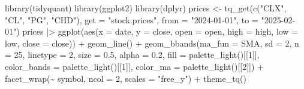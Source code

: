 \documentclass[
  letterpaper,
  DIV=11,
  numbers=noendperiod]{scrartcl}
\newenvironment{Shaded}{\begin{snugshade}}{\end{snugshade}}
\newcommand{\AttributeTok}[1]{\textcolor[rgb]{0.40,0.45,0.13}{#1}}
\newcommand{\DecValTok}[1]{\textcolor[rgb]{0.68,0.00,0.00}{#1}}
\newcommand{\FloatTok}[1]{\textcolor[rgb]{0.68,0.00,0.00}{#1}}
\newcommand{\FunctionTok}[1]{\textcolor[rgb]{0.28,0.35,0.67}{#1}}
\newcommand{\NormalTok}[1]{\textcolor[rgb]{0.00,0.23,0.31}{#1}}
\newcommand{\OtherTok}[1]{\textcolor[rgb]{0.00,0.23,0.31}{#1}}
\newcommand{\SpecialCharTok}[1]{\textcolor[rgb]{0.37,0.37,0.37}{#1}}
\newcommand{\StringTok}[1]{\textcolor[rgb]{0.13,0.47,0.30}{#1}}
\begin{document}
\begin{Shaded}
\begin{Highlighting}[]
\FunctionTok{library}\NormalTok{(tidyquant)}
\FunctionTok{library}\NormalTok{(ggplot2)}
\FunctionTok{library}\NormalTok{(dplyr)}
\NormalTok{prices }\OtherTok{\textless{}{-}} \FunctionTok{tq\_get}\NormalTok{(}\FunctionTok{c}\NormalTok{(}\StringTok{"CLX"}\NormalTok{, }\StringTok{"CL"}\NormalTok{, }\StringTok{"PG"}\NormalTok{, }\StringTok{"CHD"}\NormalTok{), }\AttributeTok{get =} \StringTok{"stock.prices"}\NormalTok{, }\AttributeTok{from =} \StringTok{"2024{-}01{-}01"}\NormalTok{, }
  \AttributeTok{to =} \StringTok{"2025{-}02{-}01"}\NormalTok{)}
\NormalTok{prices }\SpecialCharTok{|\textgreater{}}
  \FunctionTok{ggplot}\NormalTok{(}\FunctionTok{aes}\NormalTok{(}\AttributeTok{x =}\NormalTok{ date, }\AttributeTok{y =}\NormalTok{ close, }\AttributeTok{open =}\NormalTok{ open,}
              \AttributeTok{high =}\NormalTok{ high, }\AttributeTok{low =}\NormalTok{ low, }\AttributeTok{close =}\NormalTok{ close)) }\SpecialCharTok{+}
    \FunctionTok{geom\_line}\NormalTok{() }\SpecialCharTok{+}
    \FunctionTok{geom\_bbands}\NormalTok{(}\AttributeTok{ma\_fun =}\NormalTok{ SMA, }\AttributeTok{sd =} \DecValTok{2}\NormalTok{, }\AttributeTok{n =} \DecValTok{25}\NormalTok{,}
                \AttributeTok{linetype =} \DecValTok{2}\NormalTok{, }\AttributeTok{size =} \FloatTok{0.5}\NormalTok{, }\AttributeTok{alpha =} \FloatTok{0.2}\NormalTok{,}
                \AttributeTok{fill        =} \FunctionTok{palette\_light}\NormalTok{()[[}\DecValTok{1}\NormalTok{]],}
                \AttributeTok{color\_bands =} \FunctionTok{palette\_light}\NormalTok{()[[}\DecValTok{1}\NormalTok{]],}
                \AttributeTok{color\_ma    =} \FunctionTok{palette\_light}\NormalTok{()[[}\DecValTok{2}\NormalTok{]]) }\SpecialCharTok{+}
    \FunctionTok{facet\_wrap}\NormalTok{(}\SpecialCharTok{\textasciitilde{}}\NormalTok{ symbol, }\AttributeTok{ncol =} \DecValTok{2}\NormalTok{, }\AttributeTok{scales =} \StringTok{"free\_y"}\NormalTok{) }\SpecialCharTok{+}
    \FunctionTok{theme\_tq}\NormalTok{()}
\end{Highlighting}
\end{Shaded}
\end{document}

